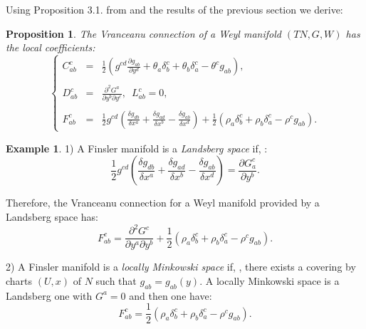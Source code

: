 \documentclass[11pt,oneside,english]{amsart}
\numberwithin{equation}{section}
\numberwithin{figure}{section}
\theoremstyle{plain}
\theoremstyle{definition}
\theoremstyle{definition}
\newtheorem{example}[thm]{Example}
\theoremstyle{plain}
\newtheorem{prop}[thm]{Proposition}
\theoremstyle{plain}
\theoremstyle{remark}
\theoremstyle{remark}
\begin{document}
Using Proposition 3.1. from \cite[p. 226-227]{b:f} and the results
of the previous section we derive:

\medskip{}

\begin{prop}
The Vranceanu connection of a Weyl manifold $(TN,G,W)$ has the local
coefficients: \begin{equation}
\left\{ \begin{array}{llll}
C_{ab}^{c} & = & \frac{1}{2}\left(g^{cd}\frac{\partial g_{ab}}{\partial y^{d}}+\theta_{a}\delta_{b}^{c}+\theta_{b}\delta_{a}^{c}-\theta^{c}g_{ab}\right),\\
\\D_{ab}^{c} & = & \frac{\partial^{2}G^{a}}{\partial y^{b}\partial y^{c}},\,\,\, L_{ab}^{c}=0,\\
\\F_{ab}^{c} & = & \frac{1}{2}g^{cd}\left(\frac{\delta g_{db}}{\delta x^{a}}+\frac{\delta g_{ad}}{\delta x^{b}}-\frac{\delta g_{ab}}{\delta x^{d}}\right)+\frac{1}{2}\left(\rho_{a}\delta_{b}^{c}+\rho_{b}\delta_{a}^{c}-\rho^{c}g_{ab}\right).\end{array}\right.\label{eq:40}\end{equation}

\end{prop}
\medskip{}

\begin{example}
1) A Finsler manifold is a \textit{Landsberg space} if, \cite[p. 239]{a:t}:
\begin{equation}
\frac{1}{2}g^{cd}\left(\frac{\delta g_{db}}{\delta x^{a}}+\frac{\delta g_{ad}}{\delta x^{b}}-\frac{\delta g_{ab}}{\delta x^{d}}\right)=\frac{\partial G_{a}^{c}}{\partial y^{b}}.\label{eq:41}\end{equation}

\end{example}
Therefore, the Vranceanu connection for a Weyl manifold provided by
a Landsberg space has: \begin{equation}
F_{ab}^{c}=\frac{\partial^{2}G^{c}}{\partial y^{a}\partial y^{b}}+\frac{1}{2}\left(\rho_{a}\delta_{b}^{c}+\rho_{b}\delta_{a}^{c}-\rho^{c}g_{ab}\right).\label{eq:42}\end{equation}

2) A Finsler manifold is a \textit{locally Minkowski space} if, \cite[p. 239]{a:t},
there exists a covering by charts $(U,x)$ of $N$ such that $g_{ab}=g_{ab}(y)$.
A locally Minkowski space is a Landsberg one with $G^{a}=0$ and then
one have: \begin{equation}
F_{ab}^{c}=\frac{1}{2}\left(\rho_{a}\delta_{b}^{c}+\rho_{b}\delta_{a}^{c}-\rho^{c}g_{ab}\right).\label{eq:43}\end{equation}
\end{document}
